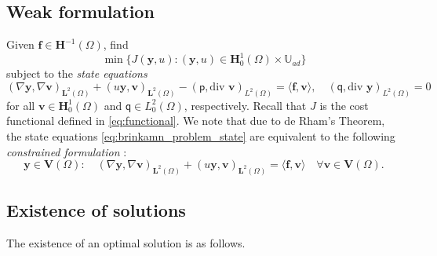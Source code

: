 \documentclass[final]{siamart0216}
\begin{document}
\subsection{Weak formulation}\label{section:weak_formulation}
Given $\mathbf{f}\in\mathbf{H}^{-1}(\Omega)$, find
\begin{equation}
\label{eq:min_functional}
\min \{J(\mathbf{y},u):(\mathbf{y},u)\in\mathbf{H}_0^1(\Omega)\times \mathbb{U}_{ad}\}
\end{equation}
subject to the \emph{state equations} 
\begin{equation}\label{eq:brinkamn_problem_state}
(\nabla \mathbf{y},\nabla \mathbf{v})_{\mathbf{L}^2(\Omega)}+( u\mathbf{y}, \mathbf{v})_{\mathbf{L}^2(\Omega)}-(\mathsf{p},\text{div }\mathbf{v})_{L^2(\Omega)}
=
\langle \mathbf{f},\mathbf{v} \rangle,
\quad
(\mathsf{q},\text{div }\mathbf{y})_{L^2(\Omega)}
=
0
\end{equation}
for all $\mathbf{v}\in \mathbf{H}_0^1(\Omega)$ and $\mathsf{q}\in L_0^2(\Omega)$, respectively. Recall that $J$ is the cost functional defined in \eqref{eq:functional}. We note that due to de Rham's Theorem, the state equations \eqref{eq:brinkamn_problem_state} are equivalent to the following \emph{constrained formulation} \cite[Section 4.1.3]{Guermond-Ern}:
\begin{equation}\label{eq:brinkamn_problem_reduced}
\mathbf{y}\in \mathbf{V}(\Omega):
\quad
(\nabla \mathbf{y},\nabla \mathbf{v})_{\mathbf{L}^2(\Omega)}
+
( u\mathbf{y}, \mathbf{v})_{\mathbf{L}^2(\Omega)} 
=  
\langle \mathbf{f},\mathbf{v} \rangle
\quad 
\forall\mathbf{v}\in \mathbf{V}(\Omega).
\end{equation}


\subsection{Existence of solutions}\label{section:existence}
The existence of an optimal solution is as follows.
 
\end{document}
